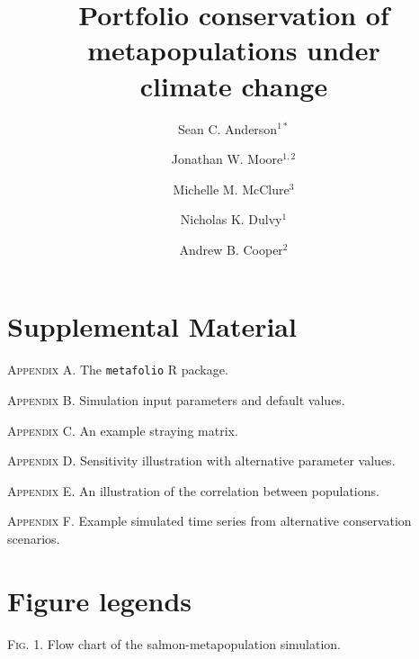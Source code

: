 \documentclass[12pt,english]{article}
\title{Portfolio conservation of metapopulations under\\climate change}
\author{
Sean C. Anderson$^{1\ast}$ \and Jonathan W. Moore$^{1,2}$ \and Michelle M. McClure$^3$ \and
Nicholas K. Dulvy$^1$ \and Andrew B. Cooper$^2$
}
\date{}
\begin{document}
\raggedright

\begin{spacing}{1.1}
\setlength\parskip{0.11in}
\setlength\parindent{0in}

\setlength\parskip{0in}
\end{spacing}

\setcounter{page}{1}
\linenumbers

\begin{spacing}{1.9}
\setlength{\parindent}{0.9cm}

\maketitle





%

\clearpage

\section{Supplemental Material}

\noindent
\textsc{Appendix A.} The \texttt{metafolio} \textsf{R} package.

\noindent
\textsc{Appendix B.} Simulation input parameters and default values.

\noindent
\textsc{Appendix C.} An example straying matrix.

\noindent
\textsc{Appendix D.} Sensitivity illustration with alternative parameter values.

\noindent
\textsc{Appendix E.} An illustration of the correlation between populations.

\noindent
\textsc{Appendix F.} Example simulated time series from alternative conservation scenarios.

\clearpage

\section{Figure legends}

\textsc{Fig. 1}. Flow chart of the salmon-metapopulation simulation.



\end{spacing}
\end{document}
